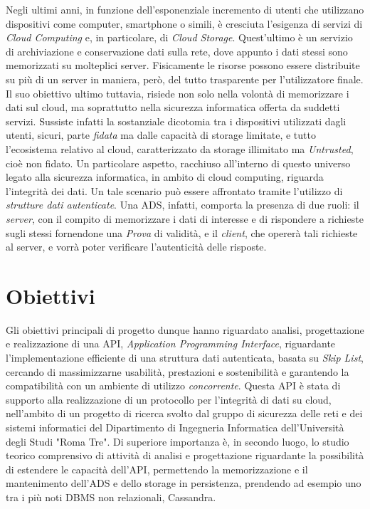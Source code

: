 
	Negli ultimi anni, in funzione dell'esponenziale incremento di utenti che utilizzano dispositivi come computer, smartphone o simili, è cresciuta l'esigenza di servizi di \textit{Cloud Computing} e, in particolare, di \textit{Cloud Storage}. Quest'ultimo è un servizio di archiviazione e conservazione dati sulla rete, dove appunto i dati stessi sono memorizzati su molteplici server. Fisicamente le risorse possono essere distribuite su più di un server in maniera, però, del tutto trasparente per l'utilizzatore finale. Il suo obiettivo ultimo tuttavia, risiede non solo nella volontà di memorizzare i dati sul cloud, ma soprattutto nella sicurezza informatica offerta da suddetti servizi.
	Sussiste infatti la sostanziale dicotomia tra i dispositivi utilizzati dagli utenti, sicuri, parte \textit{fidata} ma dalle capacità di storage limitate, e tutto l'ecosistema relativo al cloud, caratterizzato da storage illimitato ma \textit{Untrusted}, cioè non fidato.
	Un particolare aspetto, racchiuso all'interno di questo universo legato alla sicurezza informatica, in ambito di cloud computing, riguarda l'integrità dei dati. Un tale scenario può essere affrontato tramite l'utilizzo di \textit{strutture dati autenticate}. Una ADS, infatti, comporta la presenza di due ruoli: il \textit{server}, con il compito di memorizzare i dati di interesse e di rispondere a richieste sugli stessi fornendone una \textit{Prova} di validità, e il \textit{client}, che opererà tali richieste al server, e vorrà poter verificare l'autenticità delle risposte.
	
	
\section{Obiettivi}


		Gli obiettivi principali di progetto dunque hanno riguardato analisi, progettazione e realizzazione di una API, \textit{Application Programming Interface}, riguardante l'implementazione efficiente di una struttura dati autenticata, basata su \textit{Skip List}, cercando di massimizzarne usabilità, prestazioni e sostenibilità e garantendo la compatibilità con un ambiente di utilizzo \textit{concorrente}. Questa API è stata di supporto alla realizzazione di un protocollo per l'integrità di dati su cloud, nell'ambito di un progetto di ricerca svolto dal gruppo di sicurezza delle reti e dei sistemi informatici del Dipartimento di Ingegneria Informatica dell'Università degli Studi "Roma Tre". Di superiore importanza è, in secondo luogo, lo studio teorico comprensivo di attività di analisi e progettazione riguardante la possibilità di estendere le capacità dell'API, permettendo la memorizzazione e il mantenimento dell'ADS e dello storage in persistenza, prendendo ad esempio uno tra i più noti DBMS non relazionali, Cassandra.

